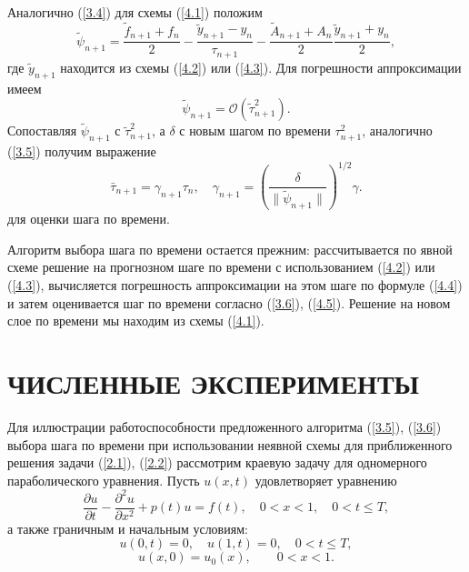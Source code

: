 \documentclass[12pt]{ncc}
\numberwithin{equation}{section}
\begin{document}
Аналогично (\ref{3.4}) для схемы (\ref{4.1}) положим
\begin{equation}\label{4.4}
 \widetilde{\psi}_{n+1}  = \frac{\widetilde{f}_{n+1}+f_n}{2} -
  \frac{\widetilde{y}_{n+1} - y_{n}}{\tau_{n+1}} - \frac{ \widetilde{A}_{n+1}+A_n}{2} \frac{\widetilde{y}_{n+1}+y_n}{2} , 
\end{equation} 
где $\widetilde{y}_{n+1}$ находится из схемы (\ref{4.2}) или (\ref{4.3}).
Для погрешности аппроксимации имеем
\[
 \widetilde{\psi}_{n+1} = \mathcal{O} (\widetilde{\tau}^2_{n+1}) .
\] 
Сопоставляя $\widetilde{\psi}_{n+1}$ с $\widetilde{\tau}^2_{n+1}$, а $\delta$ с новым шагом
по времени $\tau^2_{n+1}$, аналогично (\ref{3.5})  получим выражение
\begin{equation}\label{4.5}
  \bar{\tau}_{n+1} = \gamma_{n+1} \tau_n,
  \quad \gamma_{n+1} = \left ( \frac{\delta}{\|\widetilde{\psi}_{n+1}\|} \right )^{1/2}  \gamma . 
\end{equation} 
для оценки шага по времени.

Алгоритм выбора шага по времени остается прежним:
рассчитывается по явной схеме решение на прогнозном шаге по времени с использованием  (\ref{4.2}) или (\ref{4.3}),
вычисляется погрешность аппроксимации на этом шаге по формуле (\ref{4.4}) и затем 
оценивается шаг по времени согласно (\ref{3.6}),  (\ref{4.5}).
Решение на новом слое по времени мы находим из схемы (\ref{4.1}).


\section{ЧИСЛЕННЫЕ ЭКСПЕРИМЕНТЫ} 

Для иллюстрации работоспособности предложенного алгоритма (\ref{3.5}), (\ref{3.6}) 
выбора шага по времени при использовании неявной схемы для приближенного решения
задачи (\ref{2.1}), (\ref{2.2}) рассмотрим краевую задачу для одномерного параболического уравнения.
Пусть $u(x,t)$ удовлетворяет уравнению
\begin{equation}\label{5.1}
  \frac{\partial u}{\partial t} - \frac{\partial^2 u}{\partial x^2} + p(t) u = f(t),
  \quad 0 < x < 1,
  \quad 0 < t \leq  T ,  
\end{equation} 
а также граничным и начальным условиям:
\begin{equation}\label{5.2}
  u(0, t) = 0,
  \quad u(1,t) = 0,
  \quad 0 < t \leq  T ,    
\end{equation} 
\begin{equation}\label{5.3}
  u(x,0) = u_0(x),
  \quad  \quad 0 <  x <  1 .
\end{equation} 
\end{document}
